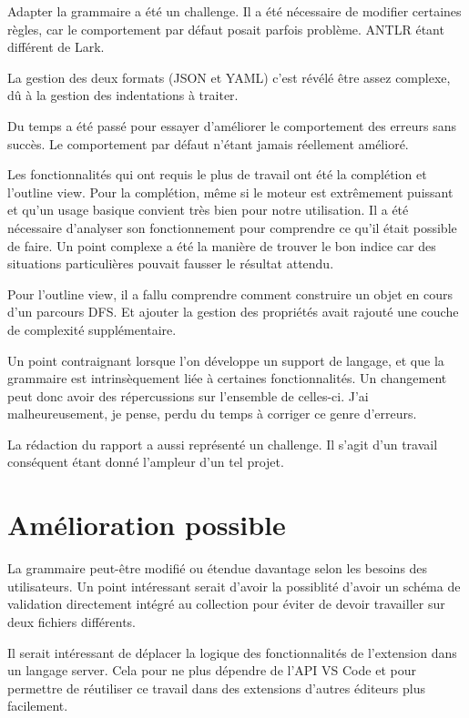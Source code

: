 \documentclass[
    iict, %
    il, %
]{heig-tb}
\begin{document}
Adapter la grammaire a été un challenge. Il a été nécessaire de modifier certaines règles, car le comportement par défaut posait parfois problème. ANTLR étant différent de Lark.

La gestion des deux formats (JSON et YAML) c'est révélé être assez complexe, dû à la gestion des indentations à traiter.

Du temps a été passé pour essayer d'améliorer le comportement des erreurs sans succès. Le comportement par défaut n'étant jamais réellement amélioré.

Les fonctionnalités qui ont requis le plus de travail ont été la complétion et l'outline view.
Pour la complétion, même si le moteur est extrêmement puissant et qu'un usage basique convient très bien pour notre utilisation.
Il a été nécessaire d'analyser son fonctionnement pour comprendre ce qu'il était possible de faire.
Un point complexe a été la manière de trouver le bon indice car des situations particulières pouvait fausser le résultat attendu.

Pour l'outline view, il a fallu comprendre comment construire un objet en cours d'un parcours DFS. Et ajouter la gestion des propriétés avait rajouté une couche de complexité supplémentaire.

Un point contraignant lorsque l'on développe un support de langage, et que la grammaire est intrinsèquement liée à certaines fonctionnalités.
Un changement peut donc avoir des répercussions sur l'ensemble de celles-ci.
J'ai malheureusement, je pense, perdu du temps à corriger ce genre d'erreurs.

La rédaction du rapport a aussi représenté un challenge. Il s'agit d'un travail conséquent étant donné l'ampleur d'un tel projet.

\section{Amélioration possible}

La grammaire peut-être modifié ou étendue davantage selon les besoins des utilisateurs.
Un point intéressant serait d'avoir la possiblité d'avoir un schéma de validation directement intégré au collection pour éviter de devoir travailler sur deux fichiers différents.

Il serait intéressant de déplacer la logique des fonctionnalités de l'extension dans un langage server. Cela pour ne plus dépendre de l'API VS Code et pour permettre de réutiliser ce travail
dans des extensions d'autres éditeurs plus facilement.
\end{document}
